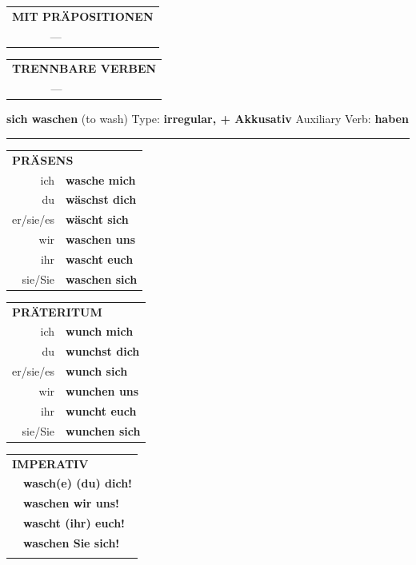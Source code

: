 \documentclass[10pt,a4paper]{revtex4-2}
\begin{document}
\begin{verbbox}
\vspace{10pt}

\begin{tabular}{lll}
\multicolumn{3}{l}{\textbf{MIT PRÄPOSITIONEN}}\\
& ---\\
\end{tabular}
\hfill
\begin{tabular}{lll}
\multicolumn{3}{l}{\textbf{TRENNBARE VERBEN}}\\
& ---\\
\end{tabular}
\vspace{-5pt}
\end{verbbox}

\begin{verbbox-acc}
        {\Large \bf sich waschen} (to wash) \hfill Type: \textbf{irregular, + Akkusativ} \hfill Auxiliary Verb: \textbf{haben} 
    
       \vspace{5pt}

    \hrule
    
    \vspace{5pt}

  \begin{tabular}{rl}
     \multicolumn{2}{l}{\textbf{PRÄSENS} }\\
    ich & \textbf{wasche mich}\\
    du & \textbf{wäschst dich}\\
    er/sie/es & \textbf{wäscht sich}\\
    wir & \textbf{waschen uns}\\
    ihr & \textbf{wascht euch}\\
    sie/Sie & \textbf{waschen sich}\\
  \end{tabular}
  \hfill
     \begin{tabular}{rl}
    \multicolumn{2}{l}{\textbf{PRÄTERITUM} }\\
    ich & \textbf{wunch mich}\\
    du & \textbf{wunchst dich}\\
    er/sie/es & \textbf{wunch sich}\\
    wir & \textbf{wunchen uns}\\
    ihr & \textbf{wuncht euch}\\
    sie/Sie & \textbf{wunchen sich}\\
  \end{tabular}
  \hfill
  \begin{tabular}{rl}
     \multicolumn{2}{l}{\textbf{IMPERATIV} }\\
   & \textbf{wasch(e) (du) dich!}\\
   & \textbf{waschen wir uns!}\\
   & \textbf{wascht (ihr) euch!}\\
   & \textbf{waschen Sie sich!}\\
   & \vspace{10pt}
  \end{tabular}


\end{verbbox-acc}
\end{document}
